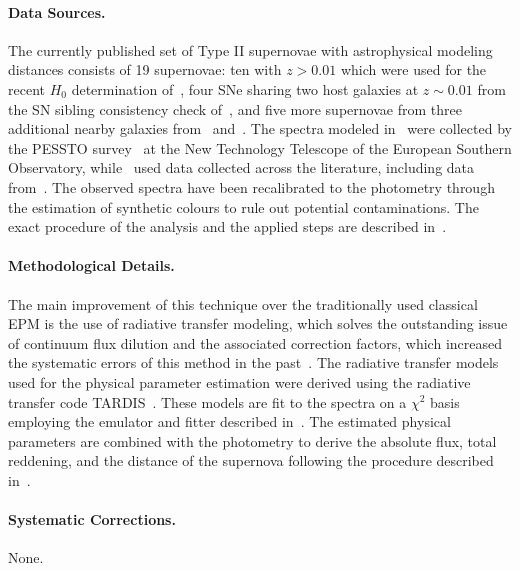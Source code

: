 \paragraph{Data Sources.}
The currently published set of Type II supernovae with astrophysical modeling distances consists of 19 supernovae: ten with $z > 0.01$ which were used for the recent $H_0$ determination of~\citet{2025AA...702A..41V}, four SNe sharing two host galaxies at $z \sim 0.01$ from the SN sibling consistency check of~\citet{2023AA...672A.129C}, and five more supernovae from three additional nearby galaxies from~\citet{2023AA...672A.129C} and~\citet{2023A&A...678A..44C}. The spectra modeled in~\citet{2025AA...702A..41V} were collected by the PESSTO survey~\citep{2015A&A...579A..40S} at the New Technology Telescope of the European Southern Observatory, while~\citet{2023AA...672A.129C} used data collected across the literature, including data from~\citet{2006PASP..118....2H,2006MNRAS.372.1315S,2011ApJ...736...76R,2019ApJ...876...19S,2022ApJ...930...34T}. The observed spectra have been recalibrated to the photometry through the estimation of synthetic colours to rule out potential contaminations. The exact procedure of the analysis and the applied steps are described in~\citet{2025AA...702A..41V}.

\paragraph{Methodological Details.}
The main improvement of this technique over the traditionally used classical EPM is the use of radiative transfer modeling, which solves the outstanding issue of continuum flux dilution and the associated correction factors, which increased the systematic errors of this method in the past~\citep[for details, see][]{2005A&A...439..671D}. The radiative transfer models used for the physical parameter estimation were derived using the radiative transfer code TARDIS~\citep{2014MNRAS.440..387K, 2019A&A...621A..29V}. These models are fit to the spectra on a $\chi^2$ basis employing the emulator and fitter described in~\citet{2020A&A...633A..88V}. The estimated physical parameters are combined with the photometry to derive the absolute flux, total reddening, and the distance of the supernova following the procedure described in~\citet{2025AA...702A..41V}.

\paragraph{Systematic Corrections.}
None.


